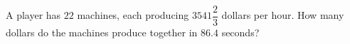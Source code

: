 A player has $22$ machines, each producing $3541\dfrac23$ dollars per hour. How many dollars do the machines produce together in $86.4$ seconds?
